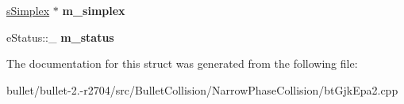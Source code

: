 \begin{DoxyCompactItemize}
\item 
\hypertarget{structgjkepa2__impl_1_1_g_j_k_a4fcd4e88e5c7cb66dd29d86884602e15}{\hyperlink{structgjkepa2__impl_1_1_g_j_k_1_1s_simplex}{s\+Simplex} $\ast$ {\bfseries m\+\_\+simplex}}\label{structgjkepa2__impl_1_1_g_j_k_a4fcd4e88e5c7cb66dd29d86884602e15}

\item 
\hypertarget{structgjkepa2__impl_1_1_g_j_k_a871d818da50b37e5585497005bc62e5c}{e\+Status\+::\+\_\+ {\bfseries m\+\_\+status}}\label{structgjkepa2__impl_1_1_g_j_k_a871d818da50b37e5585497005bc62e5c}

\end{DoxyCompactItemize}


The documentation for this struct was generated from the following file\+:\begin{DoxyCompactItemize}
\item 
bullet/bullet-\/2.-\/r2704/src/\+Bullet\+Collision/\+Narrow\+Phase\+Collision/bt\+Gjk\+Epa2.\+cpp\end{DoxyCompactItemize}
